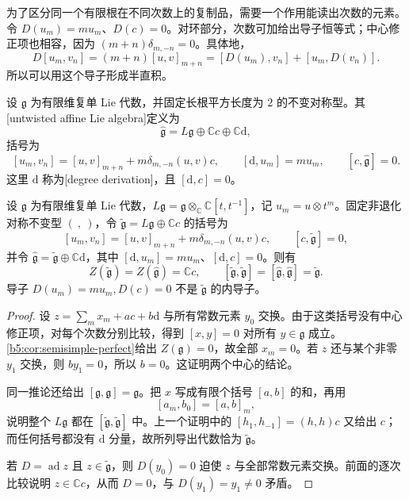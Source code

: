 为了区分同一个有限根在不同次数上的复制品，需要一个作用能读出次数的元素。令 \(D(u_m)=mu_m\)、\(D(c)=0\)。对环部分，次数可加给出导子恒等式；中心修正项也相容，因为 \((m+n)\delta_{m,-n}=0\)。具体地，
\[
	D[u_m,v_n]=(m+n)[u,v]_{m+n}
	=[D(u_m),v_n]+[u_m,D(v_n)].
\]
所以可以用这个导子形成半直积。

\begin{definition}\label{b5:def:G-affine-loop-algebra}
	设 \(\mathfrak g\) 为有限维复单 Lie 代数，并固定长根平方长度为 \(2\) 的不变对称型。其[untwisted affine Lie algebra]定义为
	\[
		\widehat{\mathfrak g}=L\mathfrak g\oplus\mathbb Cc\oplus\mathbb C\mathrm d,
	\]
	括号为
	\begin{equation}\label{b5:eq:G-affine-bracket}
		[u_m,v_n]=[u,v]_{m+n}+m\delta_{m,-n}(u,v)c,
		\qquad[\mathrm d,u_m]=mu_m,
		\qquad[c,\widehat{\mathfrak g}]=0.
	\end{equation}
	这里 \(\mathrm d\) 称为[degree derivation]，且 \([\mathrm d,c]=0\)。
\end{definition}

\begin{proposition}\label{b5:prop:G-affine-center-derived}
	设 \(\mathfrak g\) 为有限维复单 Lie 代数，\(L\mathfrak g=\mathfrak g\otimes_{\mathbb C}\mathbb C[t,t^{-1}]\)，记 \(u_m=u\otimes t^m\)。固定非退化对称不变型 \((\ ,\ )\)，令 \(\widetilde{\mathfrak g}=L\mathfrak g\oplus\mathbb Cc\) 的括号为
	\[
		[u_m,v_n]=[u,v]_{m+n}+m\delta_{m,-n}(u,v)c,\qquad[c,\widetilde{\mathfrak g}]=0,
	\]
	并令 \(\widehat{\mathfrak g}=\widetilde{\mathfrak g}\oplus\mathbb C\mathrm d\)，其中 \([\mathrm d,u_m]=mu_m\)、\([\mathrm d,c]=0\)。则有
	\[
		Z(\widetilde{\mathfrak g})=Z(\widehat{\mathfrak g})=\mathbb Cc,
		\qquad[\widetilde{\mathfrak g},\widetilde{\mathfrak g}]
		=[\widehat{\mathfrak g},\widehat{\mathfrak g}]=\widetilde{\mathfrak g}.
	\]
	导子 \(D(u_m)=mu_m,D(c)=0\) 不是 \(\widetilde{\mathfrak g}\) 的内导子。
\end{proposition}
\begin{proof}
	设 \(z=\sum_m x_m+ac+b\mathrm d\) 与所有常数元素 \(y_0\) 交换。由于这类括号没有中心修正项，对每个次数分别比较，得到 \([x,y]=0\) 对所有 \(y\in\mathfrak g\) 成立。\cref{b5:cor:semisimple-perfect}给出 \(Z(\mathfrak g)=0\)，故全部 \(x_m=0\)。若 \(z\) 还与某个非零 \(y_1\) 交换，则 \(by_1=0\)，所以 \(b=0\)。这证明两个中心的结论。

	同一推论还给出 \([\mathfrak g,\mathfrak g]=\mathfrak g\)。把 \(x\) 写成有限个括号 \([a,b]\) 的和，再用
	\[
		[a_m,b_0]=[a,b]_m,
	\]
	说明整个 \(L\mathfrak g\) 都在 \([\widetilde{\mathfrak g},\widetilde{\mathfrak g}]\) 中。上一个证明中的 \([h_1,h_{-1}]=(h,h)c\) 又给出 \(c\)；而任何括号都没有 \(\mathrm d\) 分量，故所列导出代数恰为 \(\widetilde{\mathfrak g}\)。

	若 \(D=\operatorname{ad}z\) 且 \(z\in\widetilde{\mathfrak g}\)，则 \(D(y_0)=0\) 迫使 \(z\) 与全部常数元素交换。前面的逐次比较说明 \(z\in\mathbb Cc\)，从而 \(D=0\)，与 \(D(y_1)=y_1\ne0\) 矛盾。
\end{proof}


